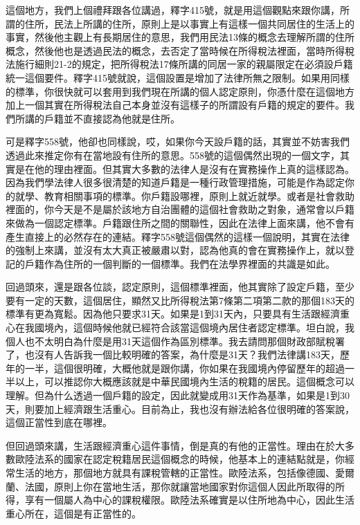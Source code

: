 \documentclass[oneside,sub3section]{ctexbook}
\begin{document}
這個地方，我們上個禮拜跟各位講過，釋字415號，就是用這個觀點來跟你講，所謂的住所，民法上所講的住所，原則上是以事實上有這樣一個共同居住的生活上的事實，然後他主觀上有長期居住的意思，我們用民法13條的概念去理解所謂的住所概念，然後他也是透過民法的概念，去否定了當時候在所得稅法裡面，當時所得稅法施行細則21-2的規定，把所得稅法17條所講的同居一家的親屬限定在必須設戶籍統一這個要件。釋字415號就說，這個設置是增加了法律所無之限制。如果用同樣的標準，你很快就可以套用到我們現在所講的個人認定原則，你憑什麼在這個地方加上一個其實在所得稅法自己本身並沒有這樣子的所謂設有戶籍的規定的要件。我們所講的戶籍並不直接認為他就是住所。

可是釋字558號，他卻也同樣說，哎，如果你今天設戶籍的話，其實並不妨害我們透過此來推定你有在當地設有住所的意思。558號的這個偶然出現的一個文字，其實是在他的理由裡面。但其實大多數的法律人是沒有在實務操作上真的這樣認為。因為我們學法律人很多很清楚的知道戶籍是一種行政管理措施，可能是作為認定你的就學、教育相關事項的標準。你戶籍設哪裡，原則上就近就學。或者是社會救助裡面的，你今天是不是屬於該地方自治團體的這個社會救助之對象，通常會以戶籍來做為一個認定標準。戶籍跟住所之間的關聯性，因此在法律上面來講，他不會有產生直接上的必然存在的連結。釋字558號這個偶然的這樣一個說明，其實在法律的強制上來講，並沒有太大真正被嚴肅以對，認為他真的會在實務操作上，就以登記的戶籍作為住所的一個判斷的一個標準。我們在法學界裡面的共識是如此。

回過頭來，還是跟各位談，認定原則，這個標準裡面，他其實除了設定戶籍，至少要有一定的天數，這個居住，顯然又比所得稅法第7條第二項第二款的那個183天的標準有更為寬鬆。因為他只要求31天。如果是1到31天內，只要具有生活跟經濟重心在我國境內，這個時候他就已經符合該當這個境內居住者認定標準。坦白說，我個人也不太明白為什麼是用31天這個作為區別標準。我去請問那個財政部賦稅署了，也沒有人告訴我一個比較明確的答案，為什麼是31天？我們法律講183天，歷年的一半，這個很明確，大概他就是跟你講，你如果在我國境內停留歷年的超過一半以上，可以推認你大概應該就是中華民國境內生活的稅籍的居民。這個概念可以理解。但為什么透過一個戶籍的設定，因此就變成用31天作為基準，如果是1到30天，則要加上經濟跟生活重心。目前為止，我也沒有辦法給各位很明確的答案說，這個正當性到底在哪裡。

但回過頭來講，生活跟經濟重心這件事情，倒是真的有他的正當性。理由在於大多數歐陸法系的國家在認定稅籍居民這個概念的時候，他基本上的連結點就是，你經常生活的地方，那個地方就具有課稅管轄的正當性。歐陸法系，包括像德國、愛爾蘭、法國，原則上你在當地生活，那你就讓當地國家對你這個人因此所取得的所得，享有一個屬人為中心的課稅權限。歐陸法系確實是以住所地為中心，因此生活重心所在，這個是有正當性的。
\end{document}
